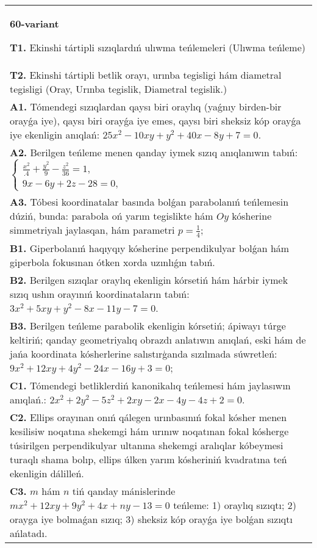 \documentclass{article}
\begin{document}
\begin{tabular}{m{17cm}}
\textbf{60-variant}
\newline

\textbf{T1.} Ekinshi tártipli sızıqlardıń ulıwma teńlemeleri (Ulıwma teńleme) \\
\textbf{T2.} Ekinshi tártipli betlik orayı, urınba tegisligi hám diametral tegisligi (Oray, Urınba tegislik, Diametral tegislik.) \\
\textbf{A1.} Tómendegi sızıqlardan qaysı biri oraylıq (yaǵnıy birden-bir orayǵa iye), qaysı biri orayǵa iye emes, qaysı biri sheksiz kóp orayǵa iye ekenligin anıqlań: $25 x^2-10 x y+y^2+40 x-8 y+7=0$. \\
\textbf{A2.} Berilgen teńleme menen qanday iymek sızıq anıqlanıwın tabıń: $\left\{\begin{array}{l}\frac{x^2}{.4}+\frac{y^2}{9}-\frac{z^2}{36}=1, \\ 9 x-6 y+2 z-28=0,\end{array}\right.$ \\
\textbf{A3.} Tóbesi koordinatalar basında bolǵan parabolanıń teńlemesin dúziń, bunda: parabola oń yarım tegislikte hám $Oy$ kósherine simmetriyalı jaylasqan, hám parametri $p=\frac{1}{4}$; \\
\textbf{B1.} Giperbolanıń haqıyqıy kósherine perpendikulyar bolǵan hám giperbola fokusınan ótken xorda uzınlıǵın tabıń. \\
\textbf{B2.} Berilgen sızıqlar oraylıq ekenligin kórsetiń hám hárbir iymek sızıq ushın orayınıń koordinataların tabıń: $3x^2+5xy+y^2-8x-11y-7=0$. \\
\textbf{B3.} Berilgen teńleme parabolik ekenligin kórsetiń; ápiwayı túrge keltiriń; qanday geometriyalıq obrazdı anlatıwın anıqlań, eski hám de jańa koordinata kósherlerine salıstırģanda sızılmada súwretleń:$9 x^2+12 x y+4 y^2-24 x-16 y+3=0$; \\
\textbf{C1.} Tómendegi betliklerdiń kanonikalıq teńlemesi hám jaylasıwın anıqlań.: $2 x^2+2 y^2-5 z^2+2 x y-2 x-4 y-4 z+2=0$. \\
\textbf{C2.} Ellips orayınan onıń qálegen urınbasınıń fokal kósher menen kesilisiw noqatına shekemgi hám urınıw noqatınan fokal kósherge túsirilgen perpendikulyar ultanına shekemgi aralıqlar kóbeymesi turaqlı shama bolıp, ellips úlken yarım kósheriniń kvadratına teń ekenligin dálilleń. \\
\textbf{C3.} $m$ hám $n$ tiń qanday mánislerinde $m x^2+12 x y+9 y^2+4 x+n y-13=0$ teńleme: 1) oraylıq sızıqtı; 2) orayga iye bolmaǵan sızıq; 3) sheksiz kóp orayǵa iye bolǵan sızıqtı ańlatadı. \\

\end{tabular}
\vspace{1cm}
\end{document}
